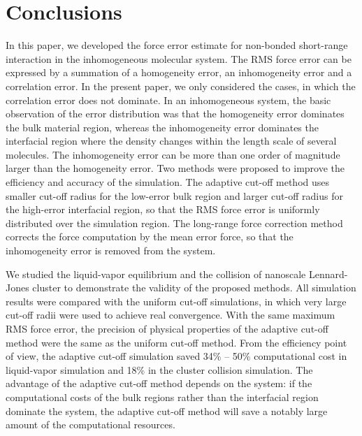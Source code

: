 \documentclass[aps,pre,preprint]{revtex4}
\newcommand{\recheck}[1]{{\color{red} #1}}
\begin{document}
\section{Conclusions}\label{sec:conclusion}

In this paper, we developed the force error estimate for non-bonded
short-range interaction in the inhomogeneous molecular system.  The
RMS force error can be expressed by a summation of a homogeneity
error, an inhomogeneity error and a correlation error. In the present
paper, we only considered the cases, in which the correlation error
does not dominate. In an inhomogeneous system, the basic observation
of the error distribution was that the homogeneity error dominates the
bulk material region, whereas the inhomogeneity error dominates the
interfacial region where the density changes within the length scale
of several molecules. The inhomogeneity error can be more than one
order of magnitude larger than the homogeneity error.  Two methods
were proposed to improve the efficiency and accuracy of the
simulation. The adaptive cut-off method uses smaller cut-off radius
for the low-error bulk region and larger cut-off radius for the
high-error interfacial region, so that the RMS force error is
uniformly distributed over the simulation region. The long-range force
correction method corrects the force computation by the mean error
force, so that the inhomogeneity error is removed from the system.

We studied the liquid-vapor equilibrium and the collision of nanoscale
Lennard-Jones cluster to demonstrate the validity of the proposed
methods.  All simulation results were compared with the uniform
cut-off simulations, in which very large cut-off radii were used to
achieve real convergence.  With the same maximum RMS force error,
the precision of physical properties of the adaptive cut-off method
were the same as the uniform cut-off method. From the efficiency
point of view,
the adaptive cut-off simulation saved 34\% -- 50\% computational cost
in liquid-vapor simulation and 18\% in the cluster collision simulation.
The advantage of the adaptive cut-off method depends on the
system:
\recheck{
  if the computational costs of the bulk regions rather than the
  interfacial region dominate the system,}
the adaptive cut-off method will save a notably large amount of the
computational resources.
\end{document}

